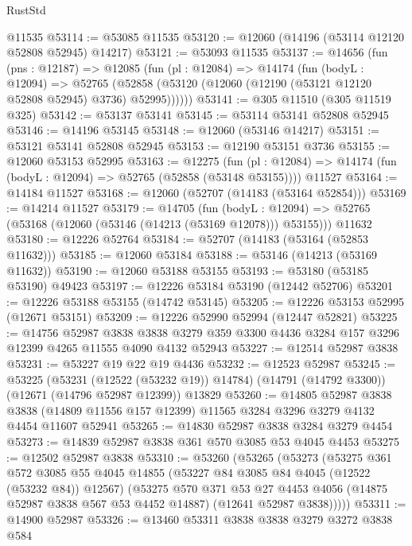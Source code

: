 \begin{lexlean}{RustStd}
\begin{coremodule}
    @11535
@53114 := @53085 @11535
@53120 := @12060 (@14196 (@53114 @12120 @52808 @52945) @14217)
@53121 := @53093 @11535
@53137 := @14656
    (fun (pns : @12187) =>
    @12085
      (fun (pl : @12084) =>
      @14174
        (fun (bodyL : @12094) =>
        @52765 (@52858 (@53120 (@12060 (@12190 (@53121 @12120 @52808 @52945) @3736) @52995))))))
@53141 := @305 @11510 (@305 @11519 @325)
@53142 := @53137 @53141
@53145 := @53114 @53141 @52808 @52945
@53146 := @14196 @53145
@53148 := @12060 (@53146 @14217)
@53151 := @53121 @53141 @52808 @52945
@53153 := @12190 @53151 @3736
@53155 := @12060 @53153 @52995
@53163 := @12275
    (fun (pl : @12084) => @14174 (fun (bodyL : @12094) => @52765 (@52858 (@53148 @53155))))
    @11527
@53164 := @14184 @11527
@53168 := @12060 (@52707 (@14183 (@53164 @52854)))
@53169 := @14214 @11527
@53179 := @14705
    (fun (bodyL : @12094) => @52765 (@53168 (@12060 (@53146 (@14213 (@53169 @12078))) @53155)))
    @11632
@53180 := @12226 @52764
@53184 := @52707 (@14183 (@53164 (@52853 @11632)))
@53185 := @12060 @53184
@53188 := @53146 (@14213 (@53169 @11632))
@53190 := @12060 @53188 @53155
@53193 := @53180 (@53185 @53190) @49423
@53197 := @12226 @53184 @53190 (@12442 @52706)
@53201 := @12226 @53188 @53155 (@14742 @53145)
@53205 := @12226 @53153 @52995 (@12671 @53151)
@53209 := @12226 @52990 @52994 (@12447 @52821)
@53225 := @14756
    @52987
    @3838
    @3838
    @3279
    @359
    @3300
    @4436
    @3284
    @157
    @3296
    @12399
    @4265
    @11555
    @4090
    @4132
    @52943
@53227 := @12514 @52987 @3838
@53231 := @53227 @19 @22 @19 @4436
@53232 := @12523 @52987
@53245 := @53225
    (@53231 (@12522 (@53232 @19)) @14784)
    (@14791 (@14792 @3300))
    (@12671 (@14796 @52987 @12399))
    @13829
@53260 := @14805
    @52987
    @3838
    @3838
    (@14809 @11556 @157 @12399)
    @11565
    @3284
    @3296
    @3279
    @4132
    @4454
    @11607
    @52941
@53265 := @14830 @52987 @3838 @3284 @3279 @4454
@53273 := @14839 @52987 @3838 @361 @570 @3085 @53 @4045 @4453
@53275 := @12502 @52987 @3838
@53310 := @53260
    (@53265
      (@53273
        (@53275
          @361
          @572
          @3085
          @55
          @4045
          @14855
          (@53227 @84 @3085 @84 @4045 (@12522 (@53232 @84)) @12567)
          (@53275
            @570
            @371
            @53
            @27
            @4453
            @4056
            (@14875 @52987 @3838 @567 @53 @4452 @14887)
            (@12641 @52987 @3838)))))
@53311 := @14900 @52987
@53326 := @13460
    @53311
    @3838
    @3838
    @3279
    @3272
    @3838
    @584

\end{coremodule}
\end{lexlean}
